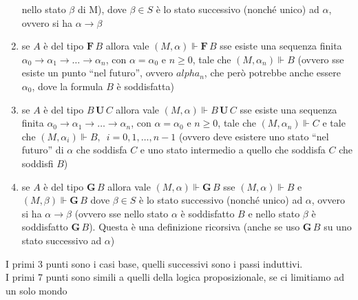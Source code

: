 \documentclass[a4paper,12pt, oneside]{book}
\begin{document}
\begin{definizione}
\begin{enumerate}
    nello stato $\beta$ di M), dove $\beta\in S$ è lo stato
    successivo (nonché unico) ad $\alpha$, ovvero si ha $\alpha\to\beta$
    \item se $A$ è del tipo $\mathbf{F}\,B$ allora vale $(M,\alpha)\Vdash
    \mathbf{F}\,B$ sse esiste una sequenza finita
    $\alpha_0\to\alpha_1\to\ldots\to\alpha_n$, con $\alpha=\alpha_0$ e $n\geq
    0$, tale che $(M,\alpha_n)\Vdash B$ (ovvero sse esiste un punto ``nel
    futuro'', ovvero $alpha_n$, che però potrebbe anche essere $\alpha_0$, dove
    la formula $B$ è soddisfatta)
    \item se $A$ è del tipo $B\,\mathbf{U}\,C$ allora vale $(M,\alpha)\Vdash
    B\,\mathbf{U}\,C$ sse esiste una sequenza finita
    $\alpha_0\to\alpha_1\to\ldots\to\alpha_n$, con $\alpha=\alpha_0$ e $n\geq
    0$, tale che $(M,\alpha_n)\Vdash C$ e tale che $(M,\alpha_i)\Vdash
    B,\,\,\,i=0,1,\ldots,n-1$ (ovvero deve esistere uno stato ``nel futuro'' di
    $\alpha$ che soddisfa $C$ e uno stato intermedio a quello che soddisfa $C$
    che soddisfi $B$) 
    \item se $A$ è del tipo $\mathbf{G}\,B$ allora vale $(M,\alpha)\Vdash
    \mathbf{G}\,B$ sse $(M,\alpha)\Vdash B$ e $(M,\beta)\Vdash \mathbf{G}\,B$
    dove $\beta\in S$ è lo stato successivo (nonché unico) ad $\alpha$, ovvero
    si ha $\alpha\to\beta$ (ovvero sse nello stato $\alpha$ è soddisfatto $B$ e
    nello stato $\beta$ è soddisfatto $\mathbf{G}\,B$). Questa è una definizione
    ricorsiva (anche se uso $\mathbf{G}\,B$ su uno stato successivo ad
    $\alpha$)
  \end{enumerate}
  I primi 3 punti sono i casi base, quelli successivi sono i passi induttivi.\\
  I primi 7 punti sono simili a quelli della logica proposizionale, se ci
  limitiamo ad un solo mondo
\end{definizione}
\end{document}
